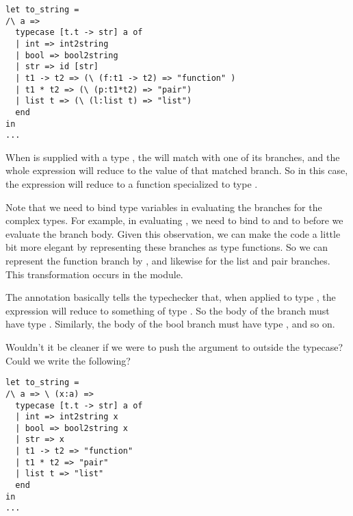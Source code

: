 \documentclass[pageno]{jpaper}
\begin{document}
{{{\begin{lstlisting}[mathescape]
let to_string = 
/\ a =>
  typecase [t.t -> str] a of
  | int => int2string
  | bool => bool2string
  | str => id [str]
  | t1 -> t2 => (\ (f:t1 -> t2) => "function" )
  | t1 * t2 => (\ (p:t1*t2) => "pair")
  | list t => (\ (l:list t) => "list")
  end
in
...
\end{lstlisting}

When  is supplied with a type , the  will match 
with one of its branches, and the whole expression will reduce to the value of that matched branch.
So in this case, the expression will reduce to a  function specialized to
type .

Note that we need to bind type variables in evaluating the branches for the complex types. For example,
in evaluating , we need to bind  to  and  to  before we evaluate the branch body. 
Given this observation, we can make the code a little bit more elegant
by representing these branches as type functions. So we can represent the function branch by
, and likewise for the list and pair branches. This transformation
occurs in the  module.

The annotation \lsti{[t.t -> str]} basically tells the typechecker that, when applied to type , the  expression will reduce to something of type . 
So the body of the  branch must have type .
Similarly, the body of the bool branch must have type , and so on.


Wouldn't it be cleaner if we were to push the argument to  outside the typecase?
Could we write the following?

\begin{lstlisting}[mathescape]
let to_string = 
/\ a => \ (x:a) =>
  typecase [t.t -> str] a of
  | int => int2string x
  | bool => bool2string x
  | str => x
  | t1 -> t2 => "function"
  | t1 * t2 => "pair"
  | list t => "list"
  end
in
...
\end{lstlisting}

}}}
\end{document}
